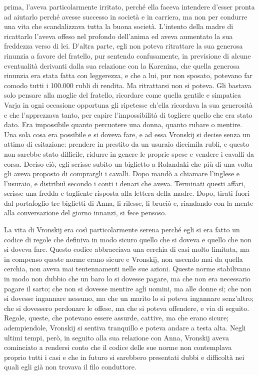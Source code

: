 prima, l'aveva particolarmente irritato, perché ella faceva intendere d'esser pronta ad aiutarlo perché avesse successo in società e in carriera, ma non per condurre una vita che scandalizzava tutta la buona società. L'intento della madre di ricattarlo l'aveva offeso nel profondo dell'anima ed aveva aumentato la sua freddezza verso di lei. D'altra parte, egli non poteva ritrattare la sua generosa rinunzia a favore del fratello, pur sentendo confusamente, in previsione di alcune eventualità derivanti dalla sua relazione con la Karenina, che quella generosa rinunzia era stata fatta con leggerezza, e che a lui, pur non sposato, potevano far comodo tutti i 100.000 rubli di rendita. Ma ritrattarsi non si poteva. Gli bastava solo pensare alla moglie del fratello, ricordare come quella gentile e simpatica Varja in ogni occasione opportuna gli ripetesse ch'ella ricordava la sua generosità e che l'apprezzava tanto, per capire l'impossibilità di togliere quello che era stato dato. Era impossibile quanto percuotere una donna, quanto rubare o mentire. Una sola cosa era possibile e si doveva fare, e ad essa Vronskij si decise senza un attimo di esitazione: prendere in prestito da un usuraio diecimila rubli, e questo non sarebbe stato difficile, ridurre in genere le proprie spese e vendere i cavalli da corsa. Deciso ciò, egli scrisse subito un biglietto a Rolandaki che più di una volta gli aveva proposto di comprargli i cavalli. Dopo mandò a chiamare l'inglese e l'usuraio, e distribuì secondo i conti i denari che aveva. Terminati questi affari, scrisse una fredda e tagliente risposta alla lettera della madre. Dopo, tirati fuori dal portafoglio tre biglietti di Anna, li rilesse, li bruciò e, riandando con la mente alla conversazione del giorno innanzi, si fece pensoso. 

La vita di Vronskij era così particolarmente serena perché egli si era fatto un codice di regole che definiva in modo sicuro quello che si doveva e quello che non si doveva fare. Questo codice abbracciava una cerchia di casi molto limitata, ma in compenso queste norme erano sicure e Vronskij, non uscendo mai da quella cerchia, non aveva mai tentennamenti nelle sue azioni. Queste norme stabilivano in modo non dubbio che un baro lo si dovesse pagare, ma che non era necessario pagare il sarto; che non si dovesse mentire agli uomini, ma alle donne sì; che non si dovesse ingannare nessuno, ma che un marito lo si poteva ingannare senz'altro; che si dovessero perdonare le offese, ma che si poteva offendere, e via di seguito. Regole, queste, che potevano essere assurde, cattive, ma che erano sicure; adempiendole, Vronskij si sentiva tranquillo e poteva andare a testa alta. Negli ultimi tempi, però, in seguito alla sua relazione con Anna, Vronskij aveva cominciato a rendersi conto che il codice delle sue norme non contemplava proprio tutti i casi e che in futuro si sarebbero presentati dubbi e difficoltà nei quali egli già non trovava il filo conduttore. 

